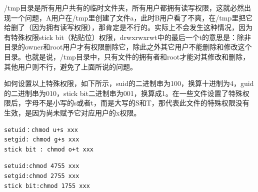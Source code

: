 \par /tmp目录是所有用户共有的临时文件夹，所有用户都拥有读写权限，这就必然出现一个问题，A用户在/tmp里创建了文件a，此时B用户看了不爽，在/tmp里把它给删了（因为拥有读写权限），那肯定是不行的。实际上不会发生这种情况，因为有特殊权限stick bit（粘贴位）权限，drwxrwxrwt中的最后一个t的意思是：除非目录的owner和root用户才有权限删除它，除此之外其它用户不能删除和修改这个目录。也就是说，/tmp目录中，只有文件的拥有者和root才能对其修改和删除，其他用户则不行，避免了上面所说的问题。
\par 如何设置以上特殊权限，如下所示，suid的二进制串为100，换算十进制为4，guid的二进制串为010，stick bit二进制串为001，换算成1。在一些文件设置了特殊权限后，字母不是小写的s或者t，而是大写的S和T，那代表此文件的特殊权限没有生效，是因为尚未赋予它对应用户的x权限。\\
\begin{minipage}{.5\linewidth}
\begin{verbatim}
setuid：chmod u+s xxx
setgid: chmod g+s xxx
stick bit : chmod o+t xxx
\end{verbatim}  
\end{minipage}
\begin{minipage}{.5\linewidth}
\begin{verbatim}
setuid:chmod 4755 xxx
setgid:chmod 2755 xxx
stick bit:chmod 1755 xxx
\end{verbatim}  
\end{minipage}
